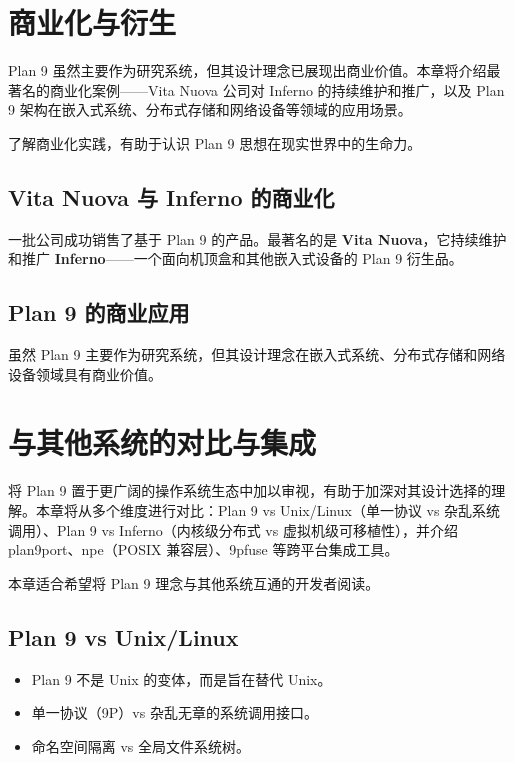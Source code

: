 \documentclass[12pt,UTF8]{ctexbook}
\begin{document}
\chapter{商业化与衍生}

Plan 9 虽然主要作为研究系统，但其设计理念已展现出商业价值。本章将介绍最著名的商业化案例——Vita Nuova 公司对 Inferno 的持续维护和推广，以及 Plan 9 架构在嵌入式系统、分布式存储和网络设备等领域的应用场景。

了解商业化实践，有助于认识 Plan 9 思想在现实世界中的生命力。

\section{Vita Nuova 与 Inferno 的商业化}

一批公司成功销售了基于 Plan 9 的产品。最著名的是 \textbf{Vita Nuova}，它持续维护和推广 \textbf{Inferno}——一个面向机顶盒和其他嵌入式设备的 Plan 9 衍生品。

\section{Plan 9 的商业应用}

虽然 Plan 9 主要作为研究系统，但其设计理念在嵌入式系统、分布式存储和网络设备领域具有商业价值。

\chapter{与其他系统的对比与集成}

将 Plan 9 置于更广阔的操作系统生态中加以审视，有助于加深对其设计选择的理解。本章将从多个维度进行对比：Plan 9 vs Unix/Linux（单一协议 vs 杂乱系统调用）、Plan 9 vs Inferno（内核级分布式 vs 虚拟机级可移植性），并介绍 plan9port、npe（POSIX 兼容层）、9pfuse 等跨平台集成工具。

本章适合希望将 Plan 9 理念与其他系统互通的开发者阅读。

\section{Plan 9 vs Unix/Linux}

\begin{itemize}
\item Plan 9 不是 Unix 的变体，而是旨在替代 Unix。
\item 单一协议（9P）vs 杂乱无章的系统调用接口。
\item 命名空间隔离 vs 全局文件系统树。
\end{itemize}
\end{document}
